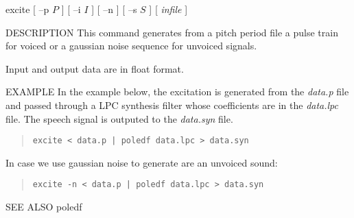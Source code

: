 
\begin{synopsis}
\item [excite] [ --p $P$ ] [ --i $I$ ] [ --n ] [ --s $S$ ] [ {\em infile} ]
\end{synopsis}

\begin{qsection}{DESCRIPTION}
This command generates from a pitch period file a pulse train for voiced
or a gaussian noise sequence for unvoiced signals.
\par
Input and output data are in float format.
\end{qsection}

\begin{options}
\end{options}

\begin{qsection}{EXAMPLE}
In the example below, the excitation is generated from the
{\em data.p} file and passed through a LPC synthesis filter
whose coefficients are in the {\em data.lpc} file.
The speech signal is outputed to the {\em data.syn} file.
\begin{quote}
 \verb!excite < data.p | poledf data.lpc > data.syn!
\end{quote} 
In case we use gaussian noise to generate are an unvoiced sound:
\begin{quote}
 \verb!excite -n < data.p | poledf data.lpc > data.syn!
\end{quote}
\end{qsection}

\begin{qsection}{SEE ALSO}
 poledf
\end{qsection}
